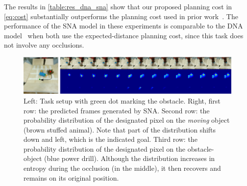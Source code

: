 The results in \autoref{table:res_dna_sna} show that our proposed planning cost in \autoref{eq:cost}
substantially outperforms the planning cost used in prior work~\cite{foresight}. The performance of the SNA model in these experiments is comparable to the DNA model~\cite{foresight} when both use the expected-distance planning cost, since this task does not involve any occlusions.
\begin{figure}
\centering
\includegraphics[width=1\linewidth]{images_sna/multiobject_qualitative/avoid_obstacle.pdf}
\caption{Left: Task setup with green dot marking the obstacle. Right, first row: the predicted frames generated by SNA. Second row: the probability distribution of the designated pixel on the \textit{moving} object (brown stuffed animal). Note that part of the distribution shifts down and left, which is the indicated goal. Third row: the probability distribution of the designated pixel on the obstacle-object (blue power drill). Although the distribution increases in entropy during the occlusion (in the middle), it then recovers and remains on its original position.
\label{fig:goingaroundocclusion}}
\end{figure}

